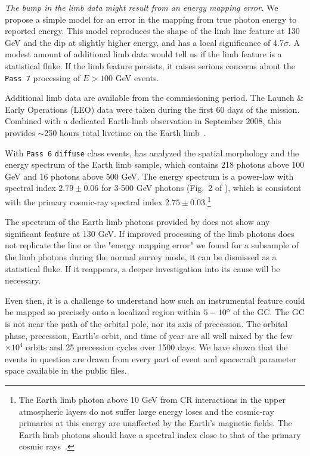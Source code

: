 \documentclass[aps,twocolumn,prd,superscriptaddress,showpacs,nofootinbib,fixfloat]{revtex4}
\newcommand{\degree}{^{\rm o}}
\begin{document}
\emph{The bump in the limb data might result from an energy mapping error.}
We propose a simple model for an error in the mapping from true photon energy
to reported energy.  This model reproduces the shape of the limb line feature
at 130 GeV and the dip at slightly higher energy, and has a local significance
of 4.7$\sigma$.  A modest amount of additional limb data would tell us if the
limb feature is a statistical fluke.  If the limb feature persists, it raises
serious concerns about the \texttt{Pass 7} processing of $E > 100$ GeV events.
\medskip

Additional limb data are available from the commissioning
period.  The Launch \& Early Operations (LEO) data were
taken during the first 60 days of the mission. Combined with
a dedicated Earth-limb observation in September 2008, this
provides $\sim$250 hours total livetime on the Earth
limb~\cite{FermiLimb}.

With \texttt{Pass 6} \texttt{diffuse} class events,
\cite{FermiLimb} has analyzed the spatial morphology and the
energy spectrum of the Earth limb sample,
which contains 218 photons above 100 GeV and 16 photons
above 500 GeV. The energy spectrum 
is a power-law with spectral index $2.79\pm
0.06$ for 3-500 GeV photons (Fig.~2 of \cite{FermiLimb}),
which is consistent with the primary cosmic-ray spectral
index $2.75\pm 0.03$.\footnote{The Earth limb photon above 10
  GeV from CR interactions in the upper atmospheric
  layers do not suffer large energy loses and the cosmic-ray
  primaries at this energy are unaffected by the Earth's
  magnetic fields. The Earth limb photons should have a
  spectral index close to that of the primary cosmic
  rays~\cite{FermiLimb}. } 

The spectrum of the Earth limb photons provided by
\citep{FermiLimb} does not show any significant feature at
130 GeV. If improved processing of the limb photons does not
replicate the line or the "energy mapping error" we found for a
subsample of the limb photons during the normal survey mode,
it can be dismissed as a statistical fluke.  If it
reappears, a deeper investigation into its cause will be necessary.

Even then, it is a challenge to understand how such an
instrumental feature could be mapped so precisely onto a
localized region within $5-10\degree$ of the GC.  The GC is
not near the path of the orbital pole, nor its axis of
precession.  The orbital phase, precession, Earth's orbit,
and time of year are all well mixed by the few $\times10^4$
orbits and 25 precession cycles over 1500 days.  We have
shown that the events in question are drawn from every part
of event and spacecraft parameter space available in the
public files. 
\end{document}
